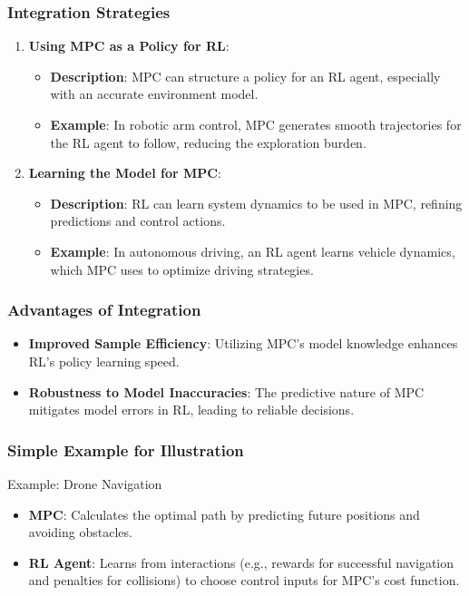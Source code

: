\documentclass[aspectratio=169]{beamer}
\begin{document}
\begin{frame}[fragile]
    \frametitle{Integration Strategies}
    \begin{enumerate}
        \item \textbf{Using MPC as a Policy for RL}:
            \begin{itemize}
                \item \textbf{Description}: MPC can structure a policy for an RL agent, especially with an accurate environment model.
                \item \textbf{Example}: In robotic arm control, MPC generates smooth trajectories for the RL agent to follow, reducing the exploration burden.
            \end{itemize}
        
        \item \textbf{Learning the Model for MPC}:
            \begin{itemize}
                \item \textbf{Description}: RL can learn system dynamics to be used in MPC, refining predictions and control actions.
                \item \textbf{Example}: In autonomous driving, an RL agent learns vehicle dynamics, which MPC uses to optimize driving strategies.
            \end{itemize}
    \end{enumerate}
\end{frame}

\begin{frame}[fragile]
    \frametitle{Advantages of Integration}
    \begin{itemize}
        \item \textbf{Improved Sample Efficiency}: Utilizing MPC's model knowledge enhances RL's policy learning speed.
        \item \textbf{Robustness to Model Inaccuracies}: The predictive nature of MPC mitigates model errors in RL, leading to reliable decisions.
    \end{itemize}
\end{frame}

\begin{frame}[fragile]
    \frametitle{Simple Example for Illustration}
    \begin{block}{Example: Drone Navigation}
        \begin{itemize}
            \item \textbf{MPC}: Calculates the optimal path by predicting future positions and avoiding obstacles.
            \item \textbf{RL Agent}: Learns from interactions (e.g., rewards for successful navigation and penalties for collisions) to choose control inputs for MPC's cost function.
        \end{itemize}
    \end{block}
\end{frame}
\end{document}
